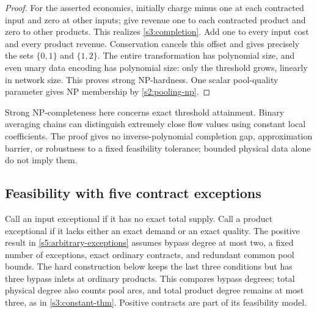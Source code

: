 \begin{proof}
For the asserted economics, initially charge minus one at each contracted
input and zero at other inputs; give revenue one to each contracted
product and zero to other products. This realizes \eqref{s3:completion}.
Add one to every input cost and every product revenue. Conservation
cancels this offset and gives precisely the sets $\{0,1\}$ and
$\{1,2\}$. The entire transformation has polynomial size, and even
unary data encoding has polynomial size: only the threshold grows,
linearly in network size. This proves strong NP-hardness. One scalar
pool-quality parameter gives NP membership by \cref{s2:pooling-np}.
\end{proof}

Strong NP-completeness here concerns exact threshold attainment. Binary
averaging chains can distinguish extremely close flow values using
constant local coefficients. The proof gives no inverse-polynomial
completion gap, approximation barrier, or robustness to a fixed
feasibility tolerance; bounded physical data alone do not imply them.

\subsection{Feasibility with five contract exceptions}\label{s3:five}

Call an input exceptional if it has no exact total supply. Call a product
exceptional if it lacks either an exact demand or an exact quality.
The positive result in \cref{s5:arbitrary-exceptions} assumes bypass
degree at most two, a fixed number of exceptions, exact ordinary
contracts, and redundant common pool bounds. The hard construction below
keeps the last three conditions but has three bypass inlets at ordinary
products. This compares bypass degrees; total physical degree also
counts pool arcs, and total product degree remains at most three, as in
\cref{s3:constant-thm}. Positive contracts are part of its feasibility
model.

